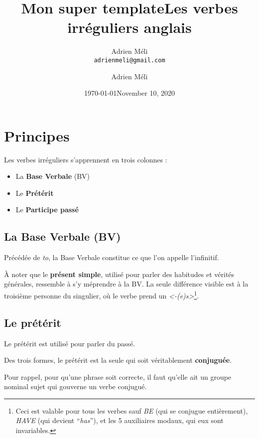 \documentclass[
  10pt,
]{article}
\title{Mon super template}
\author{Adrien M\'{e}li\\{\tt adrienmeli@gmail.com}}
\date{\today}
\title{Les verbes irréguliers anglais}
\author{Adrien Méli}
\date{November 10, 2020}
\begin{document}
\maketitle

\pagestyle{fancy}

\hypertarget{principes}{%
\section{Principes}\label{principes}}

Les verbes irréguliers s'apprennent en trois colonnes :

\begin{itemize}
\item
  La \textbf{Base Verbale} (BV)
\item
  Le \textbf{Prétérit}
\item
  Le \textbf{Participe passé}
\end{itemize}

\hypertarget{la-base-verbale-bv}{%
\subsection{La Base Verbale (BV)}\label{la-base-verbale-bv}}

Précédée de \emph{to}, la Base Verbale constitue ce que l'on appelle l'infinitif.

À noter que le \textbf{présent simple}, utilisé pour parler des habitudes et vérités générales, ressemble à s'y méprendre à la BV.
La seule différence visible est à la troisième personne du singulier, où le verbe prend un \emph{\textless-(e)s\textgreater{}}\footnote{Ceci est valable pour tous les verbes sauf \emph{BE} (qui se conjugue entièrement), \emph{HAVE} (qui devient ``\emph{has}''), et les 5 auxiliaires modaux, qui eux sont invariables.}.

\hypertarget{le-pruxe9tuxe9rit}{%
\subsection{Le prétérit}\label{le-pruxe9tuxe9rit}}

Le prétérit est utilisé pour parler du passé.

Des trois formes, le prétérit est la seule qui soit véritablement \textbf{conjuguée}.

Pour rappel, pour qu'une phrase soit correcte, il faut qu'elle ait un groupe nominal sujet qui gouverne un verbe conjugué.
\end{document}
